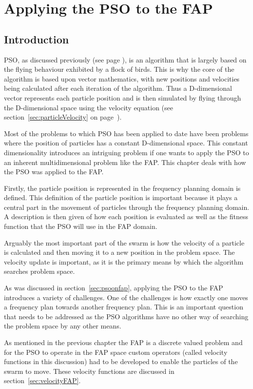 \chapter{Applying the PSO to the FAP}
\label{chpt:psoapplicationFAP}
\section{Introduction}
PSO, as discussed previously (see page \pageref{sec:PSO}), is an algorithm that is largely based on the flying behaviour exhibited by a flock of birds. This is why the core of the algorithm is based upon vector mathematics, with new positions and velocities being calculated after each iteration of the algorithm. Thus a D-dimensional vector represents each particle position and is then simulated by flying through the D-dimensional space using the velocity equation (see section~\ref{sec:particleVelocity} on page~\pageref{eq:velocityupdate}).

Most of the problems to which \gls{PSO} has been applied to date have been problems where the position of particles has a constant D-dimensional space. This constant dimensionality introduces an intriguing problem if one wants to apply the \gls{PSO} to an inherent multidimensional problem like the \gls{FAP}. This chapter deals with how the \gls{PSO} was applied to the \gls{FAP}.

Firstly, the particle position is represented in the frequency planning domain is defined. This definition of the particle position is important because it plays a central part in the movement of particles through the frequency planning domain. A description is then given of how each position is evaluated as well as the fitness function that the \gls{PSO} will use in the \gls{FAP} domain.

Arguably the most important part of the swarm is how the velocity of a particle is calculated and then moving it to a new position in the problem space. The velocity update is important, as it is the primary means by which the algorithm searches problem space.

As was discussed in section~\ref{sec:psoonfap}, applying the \gls{PSO} to the \gls{FAP} introduces a variety of challenges. One of the challenges is how exactly one moves a frequency plan towards another frequency plan. This is an important question that needs to be addressed as the \gls{PSO} algorithms have no other way of searching the problem space by any other means.

As mentioned in the previous chapter the FAP is a discrete valued problem and for the \gls{PSO} to operate in the \gls{FAP} space custom operators (called velocity functions in this discussion) had to be developed to enable the particles of the swarm to move. These velocity functions are discussed in section~\ref{sec:velocityFAP}. 

